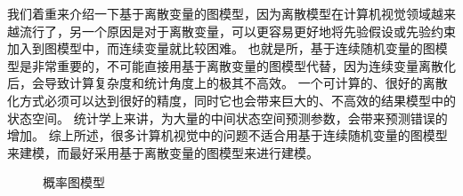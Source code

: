 我们着重来介绍一下基于离散变量的图模型，因为离散模型在计算机视觉领域越来越流行了，另一个原因是对于离散变量，可以更容易更好地将先验假设或先验约束加入到图模型中，而连续变量就比较困难。
也就是所，基于连续随机变量的图模型是非常重要的，不可能直接用基于离散变量的图模型代替，因为连续变量离散化后，会导致计算复杂度和统计角度上的极其不高效。
一个可计算的、很好的离散化方式必须可以达到很好的精度，同时它也会带来巨大的、不高效的结果模型中的状态空间。
统计学上来讲，为大量的中间状态空间预测参数，会带来预测错误的增加。
综上所述，很多计算机视觉中的问题不适合用基于连续随机变量的图模型来建模，而最好采用基于离散变量的图模型来进行建模。


\begin{figure}[tbp]
    \centering
    \caption{
        概率图模型
    }
    \label{fig:graphmodel}
\end{figure}


